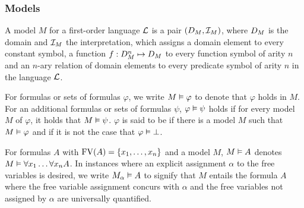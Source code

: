 \subsubsection*{Models}
A model $M$ for a first-order language $\operatorname{\mathcal{L}}$ is a pair $(D_{M}, \mathcal{I}_{M})$, where $D_{M}$ is the domain and $\mathcal{I}_{M}$ the interpretation, which assigns a domain element to every constant symbol, a function $f : D_{M}^n \mapsto D_{M}$ to every function symbol of arity $n$ and an $n$-ary relation of domain elements to every predicate symbol of arity $n$ in the language $\operatorname{\mathcal{L}}$.

For formulas or sets of formulas $\varphi$, we write $M \vDash \varphi$ to denote that $\varphi$ holds in $M$.
For an additional formulas or sets of formulas $\psi$, $\varphi \vDash \psi$ holds if for every model $M$ of $\varphi$, it holds that $M \vDash \psi$.
 $\varphi$ is said to be  if there is a model $M$ such that $M \vDash \varphi$
and  if it is not the case that $\varphi \vDash \bot$.

For formulas $A$ with $\operatorname{FV}(A) = \{x_1, \dots, x_n\}$ and a model $M$, $M\vDash A$ denotes $M \vDash \forall x_1 \dots \forall x_n A$.
In instances where an explicit assignment $\alpha$ to the free variables is desired,
we write $M_\alpha \vDash A$ 
to signify that $M$ entails the formula $A$ where the free variable assignment concurs with $\alpha$ and the free variables not assigned by $\alpha$ are universally quantified.








